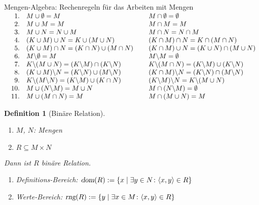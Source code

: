 \documentclass{article}
\newtheorem{Definition}{Definition}
\begin{document}
\noindent
Mengen-Algebra: Rechenregeln f\"{u}r das Arbeiten mit Mengen 
\\[0.3cm]
$\begin{array}{rlcl}
\quad 1. & M \cup \emptyset = M         & \hspace*{0.1cm} & M \cap \emptyset = \emptyset \\
2. & M \cup M = M         & \hspace*{0.1cm} & M \cap M = M          \\
3. & M \cup N = N \cup M  &  & M \cap N = N \cap M  \\
4. & (K \cup M) \cup N = K \cup (M \cup N) &  & (K \cap M) \cap N = K \cap (M \cap N) \\
5. & (K \cup M) \cap N = (K \cap N) \cup (M \cap N) &  & (K \cap M) \cup N = (K \cup N) \cap (M \cup N)  \\
6. & M \backslash \emptyset = M & & M \backslash M = \emptyset \\
7. & K \backslash (M \cup N) = (K \backslash M) \cap (K \backslash N) &&
     K \backslash (M \cap N) = (K \backslash M) \cup (K \backslash N) \\
8. & (K \cup M) \backslash N = (K \backslash N) \cup (M \backslash N) &&
     (K \cap M) \backslash N = (K \backslash N) \cap (M \backslash N) \\
9. & K \backslash (M \backslash N) = (K \backslash M) \cup (K \cap N) &&
     (K \backslash M) \backslash N = K \backslash (M \cup N) \\
10. & M \cup (N \backslash M) = M \cup N &&
      M \cap (N \backslash M) = \emptyset  \\
11. & M \cup (M \cap N) = M  &&
      M \cap (M \cup N) = M 

\end{array}$

\noindent
\begin{Definition}[Bin\"{a}re Relation] \hspace*{\fill} \\[-0.5cm]
  \begin{enumerate}
  \item $M$, $N$: Mengen
  \item $R \subseteq M \times N$
  \end{enumerate}
  Dann ist $R$ bin\"{a}re Relation.
  \begin{enumerate}
  \item Definitions-Bereich: \quad $\textsl{dom}(R) := \{ x \mid \exists y \in N \colon \langle x, y \rangle \in R \}$
  \item Werte-Bereich: \hspace*{1cm} $\textsl{rng}(R) := \{ y \mid \exists x \in M \colon \langle x, y \rangle \in R\}$ 
  \end{enumerate} 
\end{Definition}
\end{document}

